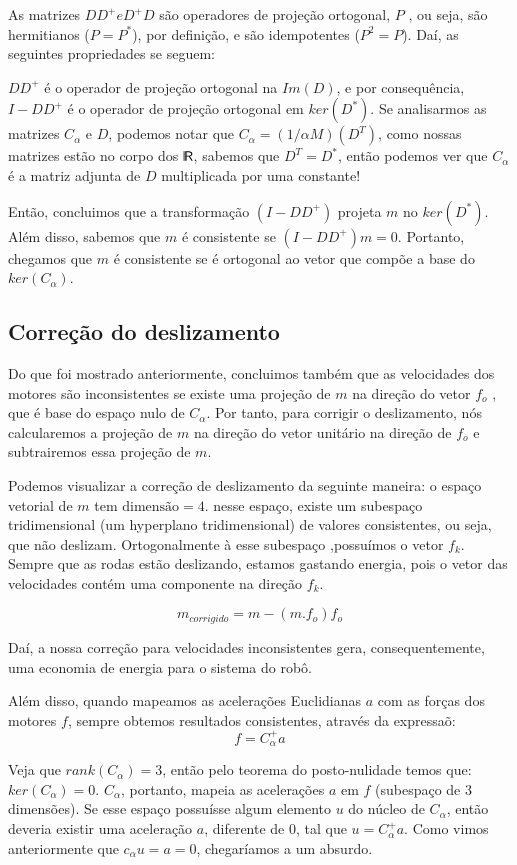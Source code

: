 \documentclass{article}
\def\bkRsf{{\sf \mbox{\vrule height0.705em width0.06em
            depth0em}\kern-.04em R}}
\begin{document}
As matrizes $DD^+ e D^+D$ são operadores de projeção ortogonal, $P$ , ou seja, são hermitianos ($P = P^*$), por definição, e são idempotentes ($P^2 = P$). Daí, as seguintes propriedades se seguem:

$DD^+$ é o operador de projeção ortogonal na $Im(D)$, e por consequência, $I - DD^+$ é o operador de projeção ortogonal em $ker(D^*)$.
Se analisarmos as matrizes $C_{\alpha}$ e $D$, podemos notar que $C_{\alpha} = (1/{\alpha}M)(D^T)$, como nossas matrizes estão no corpo dos $\bkRsf$, sabemos que $D^T = D^*$, então podemos ver que $C_{\alpha}$ é a matriz adjunta de $D$ multiplicada por uma constante!

Então, concluimos que a transformação $(I-DD^+)$ projeta $m$ no $ker(D^*)$. Além disso, sabemos que $m$ é consistente se $(I-DD^+)m = 0$. Portanto, chegamos que $m$ é consistente se é ortogonal ao vetor que compõe a base do $ker(C_{\alpha})$.

\subsection{Correção do deslizamento}

\hspace{1cm} Do que foi mostrado anteriormente, concluimos também que as velocidades dos motores são inconsistentes se existe uma projeção de $m$ na direção do vetor $f_o$ , que é base do espaço nulo de $C_{\alpha}$. Por tanto, para corrigir o deslizamento, nós calcularemos a projeção de $m$ na direção do vetor unitário na direção de $f_{o}$ e subtrairemos essa projeção de $m$.

Podemos visualizar a correção de deslizamento da seguinte maneira: o espaço vetorial de $m$ tem $\text{dimensão}= 4$. nesse espaço, existe um subespaço tridimensional (um hyperplano tridimensional) de valores consistentes, ou seja, que não deslizam. Ortogonalmente à esse subespaço ,possuímos o vetor $f_{k}$. Sempre que as rodas estão deslizando, estamos gastando energia, pois o vetor das velocidades contém uma componente na direção $f_{k}$.

\[m_{corrigido} = m - (m . f_{o})f_{o}\]

Daí, a nossa correção para velocidades inconsistentes gera, consequentemente, uma economia de energia para o sistema do robô.

Além disso, quando mapeamos as acelerações Euclidianas $a$ com as forças dos motores $f$, sempre obtemos resultados consistentes, através da expressaõ:
\[f = C_{\alpha}^+a\]

Veja que $rank(C_{\alpha}) = 3$, então pelo teorema do posto-nulidade temos que: $ker(C_{\alpha}) = 0$. $C_{\alpha}$, portanto, mapeia as acelerações $a$  em $f$ (subespaço de 3 dimensões). Se esse espaço possuísse algum elemento $u$ do núcleo de $C_{\alpha}$, então deveria existir uma aceleração $a$, diferente de 0, tal que $u = C_{\alpha}^+a$. Como vimos anteriormente que $c_ {\alpha}u = a = 0$, chegaríamos a um absurdo.
\end{document}
